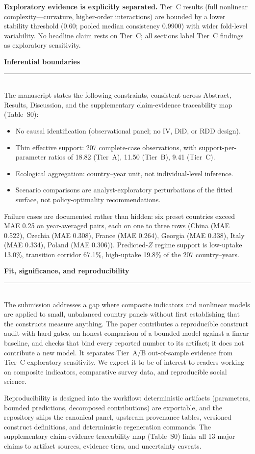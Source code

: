 \documentclass[11pt]{article}
\newcommand{\SubRule}{{\color{black!65}\rule{\linewidth}{0.4pt}}}
\newcommand{\SmallHeading}[1]{\needspace{5\baselineskip}\vspace{0.85em}\noindent\textbf{#1}\\[-0.25em]\SubRule\\[0.45em]}
\begin{document}
\noindent \textbf{Exploratory evidence is explicitly separated.} Tier~C results (full nonlinear complexity---curvature, higher-order interactions) are bounded by a lower stability threshold (0.60; pooled median consistency 0.9900) with wider fold-level variability. No headline claim rests on Tier~C; all sections label Tier~C findings as exploratory sensitivity.

\SmallHeading{Inferential boundaries}

\noindent The manuscript states the following constraints, consistent across Abstract, Results, Discussion, and the supplementary claim-evidence traceability map (Table~S0):
\begin{itemize}
\item No causal identification (observational panel; no IV, DiD, or RDD design).
\item Thin effective support: 207 complete-case observations, with support-per-parameter ratios of 18.82 (Tier~A), 11.50 (Tier~B), 9.41 (Tier~C).
\item Ecological aggregation: country--year unit, not individual-level inference.
\item Scenario comparisons are analyst-exploratory perturbations of the fitted surface, not policy-optimality recommendations.
\end{itemize}
\noindent Failure cases are documented rather than hidden: six preset countries exceed MAE 0.25 on year-averaged pairs, each on one to three rows (China (MAE 0.522), Czechia (MAE 0.308), France (MAE 0.264), Georgia (MAE 0.338), Italy (MAE 0.334), Poland (MAE 0.306)). Predicted-$Z$ regime support is low-uptake 13.0\%, transition corridor 67.1\%, high-uptake 19.8\% of the 207 country--years.

\SmallHeading{Fit, significance, and reproducibility}

\noindent The submission addresses a gap where composite indicators and nonlinear models are applied to small, unbalanced country panels without first establishing that the constructs measure anything. The paper contributes a reproducible construct audit with hard gates, an honest comparison of a bounded model against a linear baseline, and checks that bind every reported number to its artifact; it does not contribute a new model. It separates Tier~A/B out-of-sample evidence from Tier~C exploratory sensitivity. We expect it to be of interest to readers working on composite indicators, comparative survey data, and reproducible social science.

\noindent Reproducibility is designed into the workflow: deterministic artifacts (parameters, bounded predictions, decomposed contributions) are exportable, and the repository ships the canonical panel, upstream provenance tables, versioned construct definitions, and deterministic regeneration commands. The supplementary claim-evidence traceability map (Table~S0) links all 13 major claims to artifact sources, evidence tiers, and uncertainty caveats.
\end{document}
